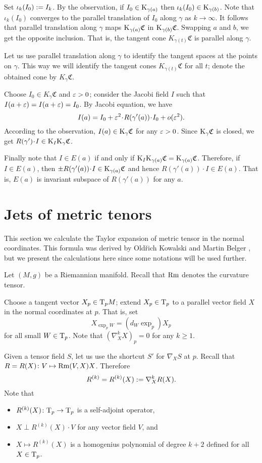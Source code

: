 \documentclass[a4paper,10pt]{article}
\begin{document}
Set $\iota_k(I_0)\mathrel{{:}{=}} I_k$.
By the observation, if $I_0\in \mathrm{K}_{\gamma(a)}$ then $\iota_k(I_0)\in \mathrm{K}_{\gamma(b)}$.
Note that $\iota_k(I_0)$ converges to the parallel translation of $I_0$ along $\gamma$ as $k\to \infty$.
It follows that parallel translation along $\gamma$ maps $\mathrm{K}_{\gamma(a)}\mathfrak{C}$ in $\mathrm{K}_{\gamma(b)}\mathfrak{C}$.
Swapping $a$ and $b$, we get the opposite inclusion.
That is, the tangent cone $K_{\gamma(t)}\mathfrak{C}$ is parallel along $\gamma$.

Let us use parallel translation along $\gamma$ to identify the tangent spaces at the points on $\gamma$.
This way we will identify the tangent cones $K_{\gamma(t)}\mathfrak{C}$ for all $t$;
denote the obtained cone by $K_\gamma\mathfrak{C}$.

Choose $I_0\in K_\gamma\mathfrak{C}$ and $\varepsilon>0$;
consider the Jacobi field $I$ such that $I(a+\eps)\z=I(a+\eps)=I_0$.
By Jacobi equation, we have
\[I(a)=I_0+\eps^2\cdot R(\gamma'(a))\cdot I_0+o(\eps^2).\]
According to the observation, $I(a)\in \mathrm{K}_{\gamma} \mathfrak{C}$ for any $\varepsilon>0$.
Since $\mathrm{K}_{\gamma} \mathfrak{C}$ is closed, we get $R(\gamma')\cdot I\z\in \K_I\K_\gamma\mathfrak{C}$.

Finally note that $I\in E(a)$ if and only if $\mathrm{K}_I\mathrm{K}_{\gamma(a)}\mathfrak{C}=\mathrm{K}_{\gamma(a)}\mathfrak{C}$.
Therefore, if $I\in E(a)$, then $\pm R(\gamma'(a))\cdot I\in \K_{\gamma(a)}\mathfrak{C}$ and hence $R(\gamma'(a))\cdot I\in E(a)$.
That is, $E(a)$ is invariant subspace of $ R(\gamma'(a))$ for any $a$.
\qeds
  
\section{Jets of metric tenors}\label{sec:jet}

This section we calculate the Taylor expansion of metric tensor in the normal coordinates.
This formula was derived by Old\v{r}ich Kowalski and Martin Belger \cite[Proposition 2.2]{kowalski-belger},
but we present the calculations here since some notations will be used further.

Let $(M,g)$ be a Riemannian manifold.
Recall that $\operatorname{Rm}$ denotes the curvature tensor.

Choose a tangent vector $X_p\in \mathrm{T}_pM$; 
extend $X_p\in \mathrm{T}_p$ to a parallel vector field $X$ in the normal coordinates at $p$.
That is, set 
\[X_{\exp_pW}=(d_W\exp_p)X_p\] for all small $W\in \mathrm{T}_p$.
Note that $(\nabla^k_X X)_p=0$ for any $k\ge 1$.

Given a tensor field $S$, let us use the shortcut $S'$  for $\nabla_XS$ at $p$.
Recall that $R=R(X)\colon V\mapsto \operatorname{Rm}(V,X)X$.
Therefore
\[R^{(k)}=R^{(k)}(X)\mathrel{{:}{=}}\nabla^k_XR(X).\]
Note that 
\begin{itemize}
\item $R^{(k)}(X)\colon\mathrm{T}_p\to\mathrm{T}_p$ is a self-adjoint operator, 
\item $X\perp R^{(k)}(X)\cdot V$ for any vector field $V$, and
\item $X\mapsto R^{(k)}(X)$ is a homogenius polynomial of degree $k+2$ defined for all $X\in \mathrm{T}_p$.
\end{itemize}
\end{document}
